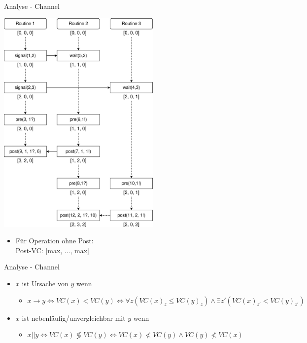\documentclass[aspectratio=169]{beamer}  %
\begin{document}
\begin{frame}{Analyse - Channel}
  \begin{minipage}{0.49\textwidth}
  \centering
  \includegraphics[width=0.6\textwidth]{img/vc.eps}
  \end{minipage}
  \hfill
  \hfill
  \begin{minipage}{0.49\textwidth}
    \begin{itemize}
      \item<3> Für Operation ohne Post:\\Post-VC: [max, ..., max]
    \end{itemize}
  \end{minipage}
\end{frame}

\begin{frame}{Analyse - Channel}
  \begin{itemize}
    \item $x$ ist Ursache von $y$ wenn
    \begin{itemize}
      \item $x \to y \Leftrightarrow VC(x) < VC(y) \Leftrightarrow \forall z (VC(x)_z \leq VC(y)_z) \land \exists z' (VC(x)_{z'} < VC(y)_{z'})$  
    \end{itemize}
    \item $x$ ist nebenläufig/unvergleichbar mit $y$ wenn
    \begin{itemize}
      \item $ x || y \Leftrightarrow VC(x) \not \lessgtr VC(y) \Leftrightarrow VC(x) \nless VC(y) \land VC(y) \nless VC(x)$
    \end{itemize}
  \end{itemize}
\end{frame}
\end{document}
